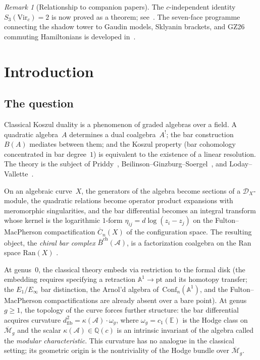 \documentclass[11pt,reqno]{amsart}
\theoremstyle{definition}
\theoremstyle{remark}
\newtheorem{remark}[theorem]{Remark}
\newcommand{\cA}{\mathcal{A}}
\newcommand{\cM}{\mathcal{M}}
\newcommand{\barB}{\bar{B}}
\newcommand{\Ran}{\mathrm{Ran}}
\newcommand{\FM}{\overline{C}}
\numberwithin{equation}{section}
\begin{document}
\begin{remark}[Relationship to companion papers]
The $c$-independent identity $S_3(\mathrm{Vir}_c) = 2$ is now proved
as a theorem; see~\cite{LorgatVirR}. The seven-face
programme connecting the shadow tower to Gaudin models, Sklyanin
brackets, and GZ26 commuting Hamiltonians is developed
in~\cite{LorgatSevenFaces}.
\end{remark}


\section{Introduction}\label{sec:intro}

\subsection{The question}

Classical Koszul duality is a phenomenon of graded algebras
over a field. A quadratic algebra~$A$ determines a dual
coalgebra~$A^!$; the bar construction $B(A)$ mediates between
them; and the Koszul property (bar cohomology concentrated in
bar degree~$1$) is equivalent to the existence of a linear
resolution. The theory is the subject of Priddy~\cite{Priddy70},
Beilinson--Ginzburg--Soergel~\cite{BGS96}, and
Loday--Vallette~\cite{LV12}.

On an algebraic curve~$X$, the generators of the algebra become
sections of a $\mathcal{D}_X$-module, the quadratic relations
become operator product expansions with meromorphic singularities,
and the bar differential becomes an integral transform whose
kernel is the logarithmic $1$-form
$\eta_{ij} = d\log(z_i - z_j)$ on the Fulton--MacPherson
compactification $\FM_n(X)$ of the configuration space. The
resulting object, the \emph{chiral bar complex}
$\barB^{\mathrm{ch}}(\cA)$, is a factorization coalgebra on the
Ran space $\Ran(X)$ \cite{BD04, FG12, CG17}.

At genus~$0$, the classical theory embeds via restriction to
the formal disk (the embedding requires specifying a retraction
$\mathbb{A}^1 \to \mathrm{pt}$ and its homotopy transfer;
the $E_1/E_\infty$ bar distinction, the Arnol'd algebra
of~$\mathrm{Conf}_n(\mathbb{A}^1)$, and the Fulton--MacPherson
compactifications are already absent over a bare point). At
genus~$g \ge 1$, the topology of the curve forces further
structure: the bar differential acquires curvature
$d_{\mathrm{fib}}^2 = \kappa(\cA) \cdot \omega_g$, where
$\omega_g = c_1(\mathbb{E})$ is the Hodge class on
$\overline{\cM}_g$ and the scalar
$\kappa(\cA) \in \mathbb{Q}(c)$ is an intrinsic invariant of
the algebra called the \emph{modular characteristic}. This
curvature has no analogue in the classical setting; its geometric
origin is the nontriviality of the Hodge bundle over
$\overline{\cM}_g$.
\end{document}
